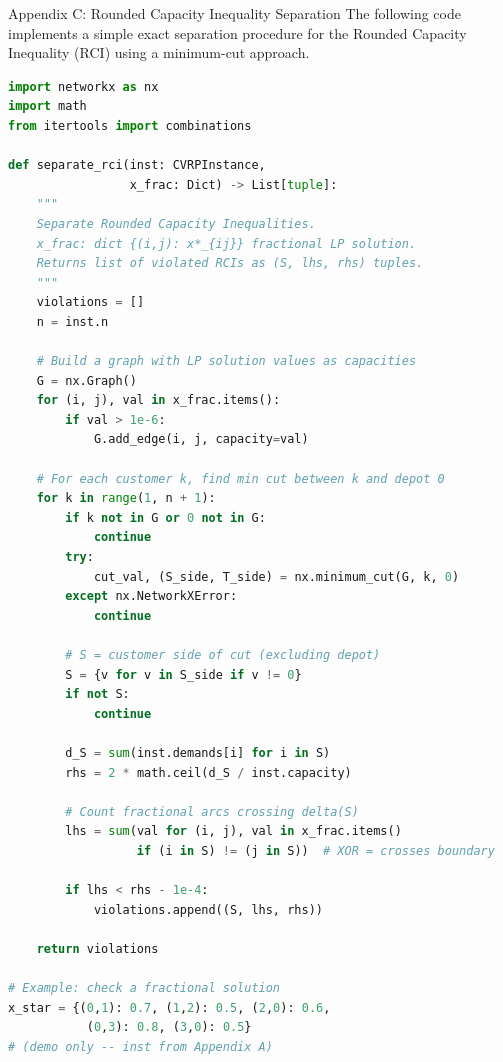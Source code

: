 \documentclass[aspectratio=169,10pt]{beamer}
\begin{document}
\begin{frame}[fragile]{Appendix C: Rounded Capacity Inequality Separation}
  The following code implements a simple exact separation procedure for
  the Rounded Capacity Inequality (RCI) using a minimum-cut approach.

\begin{lstlisting}[language=Python, caption={RCI separation using minimum cut (simplified)}]
import networkx as nx
import math
from itertools import combinations

def separate_rci(inst: CVRPInstance,
                 x_frac: Dict) -> List[tuple]:
    """
    Separate Rounded Capacity Inequalities.
    x_frac: dict {(i,j): x*_{ij}} fractional LP solution.
    Returns list of violated RCIs as (S, lhs, rhs) tuples.
    """
    violations = []
    n = inst.n

    # Build a graph with LP solution values as capacities
    G = nx.Graph()
    for (i, j), val in x_frac.items():
        if val > 1e-6:
            G.add_edge(i, j, capacity=val)

    # For each customer k, find min cut between k and depot 0
    for k in range(1, n + 1):
        if k not in G or 0 not in G:
            continue
        try:
            cut_val, (S_side, T_side) = nx.minimum_cut(G, k, 0)
        except nx.NetworkXError:
            continue

        # S = customer side of cut (excluding depot)
        S = {v for v in S_side if v != 0}
        if not S:
            continue

        d_S = sum(inst.demands[i] for i in S)
        rhs = 2 * math.ceil(d_S / inst.capacity)

        # Count fractional arcs crossing delta(S)
        lhs = sum(val for (i, j), val in x_frac.items()
                  if (i in S) != (j in S))  # XOR = crosses boundary

        if lhs < rhs - 1e-4:
            violations.append((S, lhs, rhs))

    return violations

# Example: check a fractional solution
x_star = {(0,1): 0.7, (1,2): 0.5, (2,0): 0.6,
           (0,3): 0.8, (3,0): 0.5}
# (demo only -- inst from Appendix A)
\end{lstlisting}
\end{frame}
\end{document}
